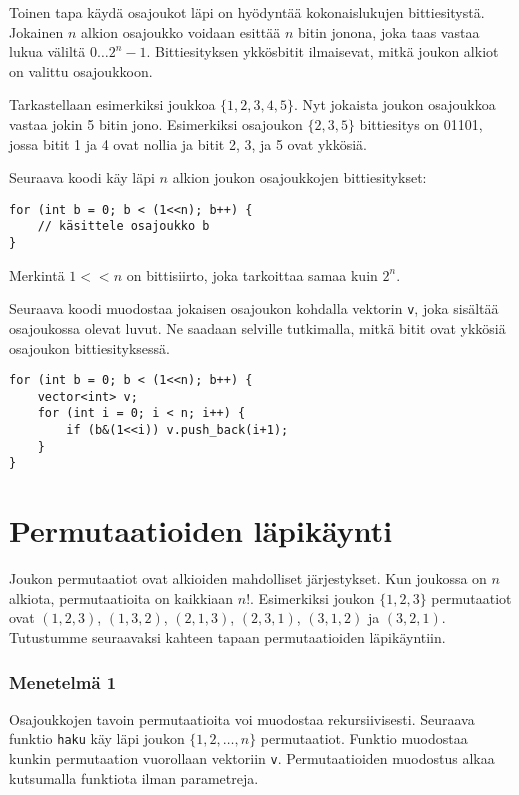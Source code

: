 Toinen tapa käydä osajoukot läpi on hyödyntää kokonaislukujen
bittiesitystä. Jokainen $n$ alkion osajoukko
voidaan esittää $n$ bitin jonona,
joka taas vastaa lukua väliltä $0 \ldots 2^n-1$.
Bittiesityksen ykkösbitit ilmaisevat,
mitkä joukon alkiot on valittu osajoukkoon.

Tarkastellaan esimerkiksi joukkoa $\{1,2,3,4,5\}$.
Nyt jokaista joukon osajoukkoa vastaa jokin
5 bitin jono.
Esimerkiksi osajoukon $\{2,3,5\}$ bittiesitys on 01101,
jossa bitit 1 ja 4 ovat nollia
ja bitit 2, 3, ja 5 ovat ykkösiä.

Seuraava koodi käy läpi $n$ alkion joukon
osajoukkojen bittiesitykset:

\begin{lstlisting}
for (int b = 0; b < (1<<n); b++) {
    // käsittele osajoukko b
}
\end{lstlisting}

Merkintä $1 < < n$ on bittisiirto,
joka tarkoittaa samaa kuin $2^n$.

Seuraava koodi muodostaa jokaisen osajoukon
kohdalla vektorin \texttt{v},
joka sisältää osajoukossa olevat luvut.
Ne saadaan selville tutkimalla, mitkä bitit ovat
ykkösiä osajoukon bittiesityksessä.

\begin{lstlisting}
for (int b = 0; b < (1<<n); b++) {
    vector<int> v;
    for (int i = 0; i < n; i++) {
        if (b&(1<<i)) v.push_back(i+1);
    }
}
\end{lstlisting}

\section{Permutaatioiden läpikäynti}

Joukon permutaatiot ovat alkioiden mahdolliset
järjestykset.
Kun joukossa on $n$ alkiota,
permutaatioita on kaikkiaan $n!$.
Esimerkiksi joukon $\{1,2,3\}$
permutaatiot ovat $(1,2,3)$, $(1,3,2)$,
$(2,1,3)$, $(2,3,1)$, $(3,1,2)$ ja $(3,2,1)$.
Tutustumme seuraavaksi kahteen tapaan
permutaatioiden läpikäyntiin.

\subsubsection{Menetelmä 1}

Osajoukkojen tavoin permutaatioita voi muodostaa
rekursiivisesti.
Seuraava funktio \texttt{haku} käy läpi
joukon $\{1,2,\ldots,n\}$ permutaatiot.
Funktio muodostaa kunkin permutaation
vuorollaan vektoriin \texttt{v}.
Permutaatioiden muodostus alkaa kutsumalla
funktiota ilman parametreja.

